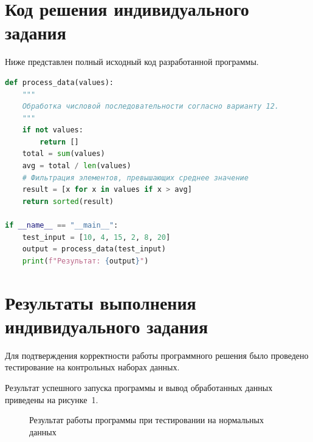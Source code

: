 \documentclass[14pt,a4paper]{extarticle}
\begin{document}
\clearpage
\section{Код решения индивидуального задания}
Ниже представлен полный исходный код разработанной программы.

% 

\begin{lstlisting}[language=Python, caption={Реализация алгоритма обработки данных}]
def process_data(values):
    """
    Обработка числовой последовательности согласно варианту 12.
    """
    if not values:
        return []
    total = sum(values)
    avg = total / len(values)
    # Фильтрация элементов, превышающих среднее значение
    result = [x for x in values if x > avg]
    return sorted(result)

if __name__ == "__main__":
    test_input = [10, 4, 15, 2, 8, 20]
    output = process_data(test_input)
    print(f"Результат: {output}")
\end{lstlisting}

\clearpage
\section{Результаты выполнения индивидуального задания}
Для подтверждения корректности работы программного решения было проведено тестирование на контрольных наборах данных.

Результат успешного запуска программы и вывод обработанных данных приведены на рисунке~1.

\begin{figure}[H]
  \centering
  \caption{Результат работы программы при тестировании на нормальных данных}
  \label{fig:screen1}
\end{figure}
\end{document}
